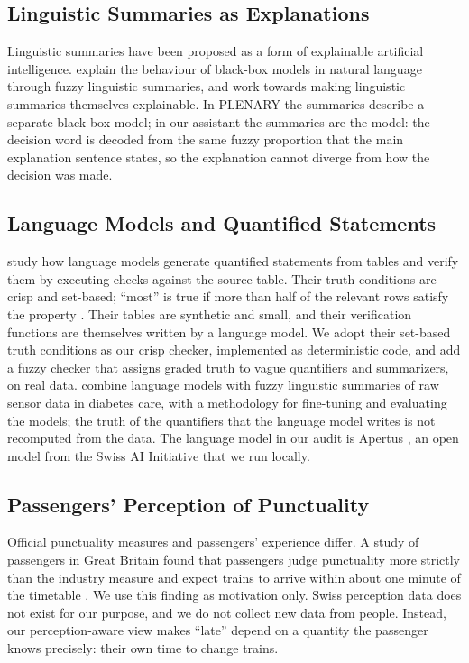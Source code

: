 \subsection{Linguistic Summaries as Explanations}
\label{sec:rw-xai}
Linguistic summaries have been proposed as a form of explainable artificial intelligence.
\citet{plenary2022} explain the behaviour of black-box models in natural language through
fuzzy linguistic summaries, and \citet{wrede2023} work towards making linguistic summaries
themselves explainable. In PLENARY the summaries describe a separate black-box model; in our
assistant the summaries are the model: the decision word is decoded from
the same fuzzy proportion that the main explanation sentence states, so the explanation
cannot diverge from how the decision was made.

\subsection{Language Models and Quantified Statements}
\label{sec:rw-llm}
\citet{eida2026} study how language models generate quantified statements from tables and
verify them by executing checks against the source table. Their truth conditions are crisp
and set-based; ``most'' is true if more than half of the relevant rows satisfy the property
\citep{eida2026}. Their tables are synthetic and small, and their verification
functions are themselves written by a language model. We adopt their set-based truth
conditions as our crisp checker, implemented as deterministic code, and add a fuzzy checker
that assigns graded truth to vague quantifiers and summarizers, on real data.
\citet{gaitan2025} combine language models with fuzzy linguistic summaries of raw sensor
data in diabetes care, with a methodology for fine-tuning and evaluating the models; the
truth of the quantifiers that the language model writes is not recomputed from the data. The
language model in our audit is Apertus \citep{apertus2025}, an open model from the Swiss AI
Initiative that we run locally.

\subsection{Passengers' Perception of Punctuality}
\label{sec:rw-perception}
Official punctuality measures and passengers' experience differ. A study of passengers in
Great Britain found that passengers judge punctuality more strictly than the industry
measure and expect trains to arrive within about one minute of the timetable
\citep{transportfocus2015}. We use this finding as motivation only. Swiss perception data
does not exist for our purpose, and we do not collect new data from people. Instead, our
perception-aware view makes ``late'' depend on a quantity the passenger knows precisely:
their own time to change trains.


